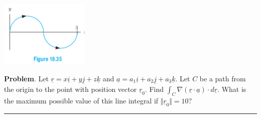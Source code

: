 \documentclass[12pt,letterpaper,noanswers]{exam}
\newcommand{\mb}[1]{\underline{#1}}
\begin{document}
\includegraphics{img/C22p2.png}


\vfill

\noindent\textbf{Problem}.  Let $\mb r = x\mb i + y\mb j + z\mb k$ and $\mb a = a_1\mb i + a_2\mb j + a_3\mb k$.  Let $C$ be a path from the origin to the point with position vector $\mb r_0$.  Find $\int_C \nabla(\mb r\cdot \mb a)\cdot d\mb r$.  What is the maximum possible value of this line integral if $\Vert \mb r_0\Vert = 10?$
\vfill




\vspace{0.2cm}
\hrule
\vspace{0.2cm}
\end{document}
